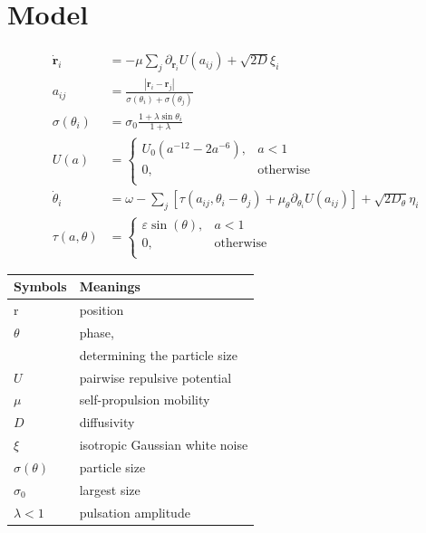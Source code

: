 \documentclass[10pt,aspectratio=43,mathserif,table]{beamer}
\begin{document}
\section{Model}
\begin{frame}
    \begin{multicols}{2}
        
        {
        \footnotesize

        $$
        \begin{aligned}
            \dot{\mathbf{r}}_i&=-\mu \sum_j{\partial _{\mathbf{r}_i}U\left( a_{ij} \right) +\sqrt{2D}\xi_i}\\
            a_{ij}&=\frac{\left| \mathbf{r}_i-\mathbf{r}_j \right|}{\sigma \left( \theta _i \right) +\sigma \left( \theta _j \right)}\\
            \sigma \left( \theta _i \right) &=\sigma _0\frac{1+\lambda \sin \theta _i}{1+\lambda}\\
            U\left( a \right) &=\begin{cases}
                U_0\left( a^{-12}-2a^{-6} \right) ,&		a<1\\
                0,&		\mathrm{otherwise}\\
            \end{cases}\\
            \dot{\theta}_i&=\omega -\sum_j{\left[ \tau \left( a_{ij},\theta _i-\theta _j \right) +\mu _{\theta}\partial _{\theta _i}U\left( a_{ij} \right) \right] +\sqrt{2D_{\theta}}\eta _i}\\
            \tau \left( a,\theta \right) &=\begin{cases}
                \varepsilon \sin \left( \theta \right) ,&		a<1\\
                0,&		\mathrm{otherwise}\\
            \end{cases}
        \end{aligned}
        $$

        \begin{tabular}{ll}
            Symbols& Meanings \\
            \hline
            $\mathrm{r}$ & position \\
            $\theta$ & phase, \\
             & determining the particle size \\
            $U$ & pairwise repulsive potential \\
            $\mu$ & self-propulsion mobility \\
            $D$ & diffusivity \\
            $\xi$ & isotropic Gaussian white noise \\
            $\sigma(\theta)$ & particle size \\
            $\sigma_0$ & largest size \\
            $\lambda<1$ & pulsation amplitude \\
        \end{tabular}
        }

    \end{multicols}

\end{frame}

\end{document}
